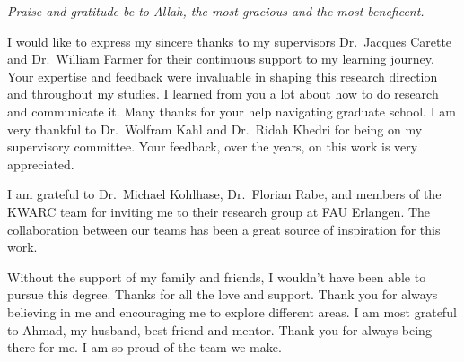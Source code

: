 \begin{center} 
\textit{Praise and gratitude be to Allah, the most gracious and the most beneficent.}
\end{center}

\noindent I would like to express my sincere thanks to my supervisors Dr.~Jacques Carette and Dr.~William Farmer for their continuous support to my learning journey.  Your expertise and feedback were invaluable in shaping this research direction and throughout my studies. 
I learned from you a lot about how to do research and communicate it. Many thanks for your help navigating graduate school. 
I am very thankful to Dr.~Wolfram Kahl and Dr.~Ridah Khedri for being on my supervisory committee. Your feedback, over the years, on this work is very appreciated. 

I am grateful to Dr.~Michael Kohlhase, Dr.~Florian Rabe, and members of the KWARC team for inviting me to their research group at FAU Erlangen. The collaboration between our teams has been a great source of inspiration for this work. 

Without the support of my family and friends, I wouldn't have been able to pursue this degree. Thanks for all the love and support. Thank you for always believing in me and encouraging me to explore different areas. 
I am most grateful to Ahmad, my husband, best friend and mentor. Thank you for always being there for me. I am so proud of the team we make. 
